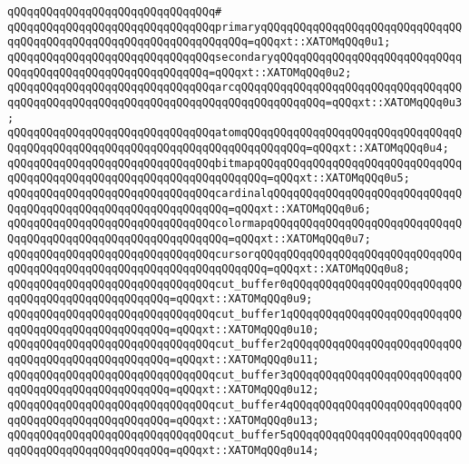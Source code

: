 \verb|qQQqqQQqqQQqqQQqqQQqqQQqqQQqqQQq#|\newline
\verb|qQQqqQQqqQQqqQQqqQQqqQQqqQQqqQQqprimaryqQQqqQQqqQQqqQQqqQQqqQQqqQQqqQQqqQQqqQQqqQQqqQQqqQQqqQQqqQQqqQQqqQQq=qQQqxt::XATOMqQQq0u1;|\newline
\verb|qQQqqQQqqQQqqQQqqQQqqQQqqQQqqQQqsecondaryqQQqqQQqqQQqqQQqqQQqqQQqqQQqqQQqqQQqqQQqqQQqqQQqqQQqqQQqqQQq=qQQqxt::XATOMqQQq0u2;|\newline
\verb|qQQqqQQqqQQqqQQqqQQqqQQqqQQqqQQqarcqQQqqQQqqQQqqQQqqQQqqQQqqQQqqQQqqQQqqQQqqQQqqQQqqQQqqQQqqQQqqQQqqQQqqQQqqQQqqQQqqQQq=qQQqxt::XATOMqQQq0u3;|\newline
\verb|qQQqqQQqqQQqqQQqqQQqqQQqqQQqqQQqatomqQQqqQQqqQQqqQQqqQQqqQQqqQQqqQQqqQQqqQQqqQQqqQQqqQQqqQQqqQQqqQQqqQQqqQQqqQQqqQQq=qQQqxt::XATOMqQQq0u4;|\newline
\verb|qQQqqQQqqQQqqQQqqQQqqQQqqQQqqQQqbitmapqQQqqQQqqQQqqQQqqQQqqQQqqQQqqQQqqQQqqQQqqQQqqQQqqQQqqQQqqQQqqQQqqQQqqQQq=qQQqxt::XATOMqQQq0u5;|\newline
\verb|qQQqqQQqqQQqqQQqqQQqqQQqqQQqqQQqcardinalqQQqqQQqqQQqqQQqqQQqqQQqqQQqqQQqqQQqqQQqqQQqqQQqqQQqqQQqqQQqqQQq=qQQqxt::XATOMqQQq0u6;|\newline
\verb|qQQqqQQqqQQqqQQqqQQqqQQqqQQqqQQqcolormapqQQqqQQqqQQqqQQqqQQqqQQqqQQqqQQqqQQqqQQqqQQqqQQqqQQqqQQqqQQqqQQq=qQQqxt::XATOMqQQq0u7;|\newline
\verb|qQQqqQQqqQQqqQQqqQQqqQQqqQQqqQQqcursorqQQqqQQqqQQqqQQqqQQqqQQqqQQqqQQqqQQqqQQqqQQqqQQqqQQqqQQqqQQqqQQqqQQqqQQq=qQQqxt::XATOMqQQq0u8;|\newline
\verb|qQQqqQQqqQQqqQQqqQQqqQQqqQQqqQQqcut_buffer0qQQqqQQqqQQqqQQqqQQqqQQqqQQqqQQqqQQqqQQqqQQqqQQqqQQq=qQQqxt::XATOMqQQq0u9;|\newline
\verb|qQQqqQQqqQQqqQQqqQQqqQQqqQQqqQQqcut_buffer1qQQqqQQqqQQqqQQqqQQqqQQqqQQqqQQqqQQqqQQqqQQqqQQqqQQq=qQQqxt::XATOMqQQq0u10;|\newline
\verb|qQQqqQQqqQQqqQQqqQQqqQQqqQQqqQQqcut_buffer2qQQqqQQqqQQqqQQqqQQqqQQqqQQqqQQqqQQqqQQqqQQqqQQqqQQq=qQQqxt::XATOMqQQq0u11;|\newline
\verb|qQQqqQQqqQQqqQQqqQQqqQQqqQQqqQQqcut_buffer3qQQqqQQqqQQqqQQqqQQqqQQqqQQqqQQqqQQqqQQqqQQqqQQqqQQq=qQQqxt::XATOMqQQq0u12;|\newline
\verb|qQQqqQQqqQQqqQQqqQQqqQQqqQQqqQQqcut_buffer4qQQqqQQqqQQqqQQqqQQqqQQqqQQqqQQqqQQqqQQqqQQqqQQqqQQq=qQQqxt::XATOMqQQq0u13;|\newline
\verb|qQQqqQQqqQQqqQQqqQQqqQQqqQQqqQQqcut_buffer5qQQqqQQqqQQqqQQqqQQqqQQqqQQqqQQqqQQqqQQqqQQqqQQqqQQq=qQQqxt::XATOMqQQq0u14;|\newline
